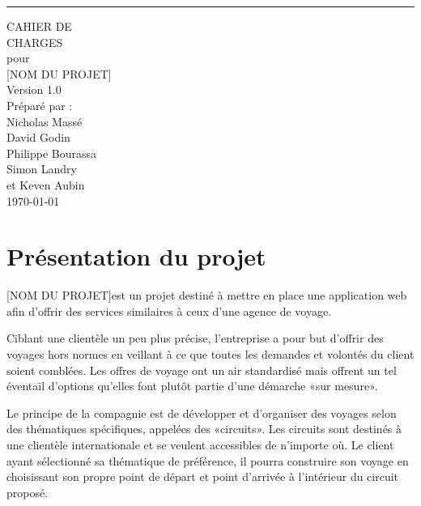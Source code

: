 \documentclass{scrreprt}
\def\myversion{1.0 }
\def\projectname{[NOM DU PROJET]}
\begin{document}
\begin{flushright}
    \rule{16cm}{5pt}\vskip1cm
    \begin{bfseries}
        \Huge{CAHIER DE \\ CHARGES}\\
        \vspace{1.5cm}
        pour\\
        \vspace{1.5cm}
        \projectname\\
        \vspace{1.5cm}
        \LARGE{Version \myversion}\\
        \vspace{1.5cm}
        Préparé par :\\
        Nicholas Massé\\
        David Godin\\
        Philippe Bourassa\\
        Simon Landry\\
        et Keven Aubin\\
        \vspace{1.5cm}
        \today\\
    \end{bfseries}
\end{flushright}
\newpage
{}
\tableofcontents
\newpage
{}
\chapter{Présentation du projet}

\projectname est un projet destiné à mettre en place une application
web afin d'offrir des services similaires à ceux d'une agence de voyage.

Ciblant une clientèle un peu plus précise, l'entreprise a pour but
d'offrir des voyages hors normes en veillant à ce que toutes les
demandes et volontés du client soient comblées. Les offres de voyage
ont un air standardisé mais offrent un tel éventail d'options qu'elles
font plutôt partie d'une démarche «sur mesure».

Le principe de la compagnie est de développer et d'organiser des
voyages selon des thématiques spécifiques, appelées des «circuits». Les
circuits sont destinés à une clientèle internationale et se veulent
accessibles de n'importe où. Le client ayant sélectionné sa thématique
de préférence, il pourra construire son voyage en choisissant son
propre point de départ et point d'arrivée à l'intérieur du circuit
proposé.
\end{document}
